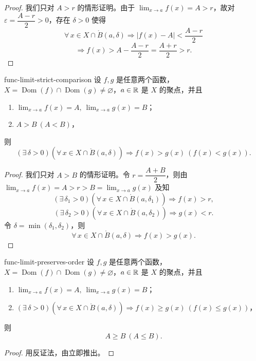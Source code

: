\begin{proof}
	我们只对 \(A>r\) 的情形证明。由于 \(\lim_{x\to a}f(x)=A>r\)，故对 \(\varepsilon=\dfrac{A-r}2>0\)，存在 \(\delta>0\) 使得
	\[
	\forall\,x\in X\cap\mathring{B}(a,\delta)\Longrightarrow |f(x)-A|<\frac{A-r}2
	\]
	\[
	\Longrightarrow f(x)>A-\frac{A-r}2=\frac{A+r}2>r.
	\]
\end{proof}

\begin{myproperty}{}{func-limit-strict-comparison}
	设 \(f,g\) 是任意两个函数，\(X=\operatorname{Dom}(f)\cap\operatorname{Dom}(g)\neq\varnothing\)，\(a\in\mathbb{R}\) 是 \(X\) 的聚点，并且
	\begin{enumerate}[label=\arabic*)]
		\item \(\lim_{x\to a}f(x)=A,\ \lim_{x\to a}g(x)=B\)；
		\item \(A>B\ (A<B)\)，
	\end{enumerate}
	则
	\[
	(\exists\,\delta>0)(\forall\,x\in X\cap\mathring{B}(a,\delta))\Longrightarrow f(x)>g(x)\ (f(x)<g(x)).
	\]
\end{myproperty}

\begin{proof}
	我们只对 \(A>B\) 的情形证明。令 \(r=\dfrac{A+B}2\)，则由 \(\lim_{x\to a}f(x)=A>r>B=\lim_{x\to a}g(x)\) 及知
	\[
	(\exists\,\delta_1>0)(\forall\,x\in X\cap\mathring{B}(a,\delta_1))\Longrightarrow f(x)>r,
	\]
	\[
	(\exists\,\delta_2>0)(\forall\,x\in X\cap\mathring{B}(a,\delta_2))\Longrightarrow g(x)<r.
	\]
	令 \(\delta=\min(\delta_1,\delta_2)\)，则
	\[
	\forall\,x\in X\cap\mathring{B}(a,\delta)\Longrightarrow f(x)>g(x).
	\]
\end{proof}

\begin{myproperty}{}{func-limit-preserves-order}
	设 \(f,g\) 是任意两个函数，\(X=\operatorname{Dom}(f)\cap\operatorname{Dom}(g)\neq\varnothing\)，\(a\in\mathbb{R}\) 是 \(X\) 的聚点，并且
	\begin{enumerate}[label=\arabic*)]
		\item \(\lim_{x\to a}f(x)=A,\ \lim_{x\to a}g(x)=B\)；
		\item \((\exists\,\delta>0)(\forall\,x\in X\cap\mathring{B}(a,\delta))\Longrightarrow f(x)\ge g(x)\ (f(x)\le g(x))\)，
	\end{enumerate}
	则
	\[
	A\ge B\ (A\le B).
	\]
\end{myproperty}

\begin{proof}
	用反证法，由立即推出。
\end{proof}

